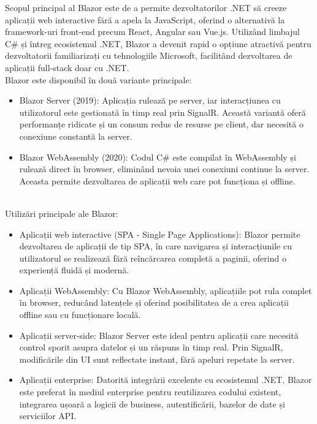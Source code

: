 Scopul principal al Blazor este de a permite dezvoltatorilor .NET să creeze aplicații web interactive fără a apela la JavaScript, oferind o alternativă la framework-uri front-end precum React, Angular sau Vue.js. Utilizând limbajul C\# și întreg ecosistemul .NET, Blazor a devenit rapid o opțiune atractivă pentru dezvoltatorii familiarizați cu tehnologiile Microsoft, facilitând dezvoltarea de aplicații full-stack doar cu .NET. \parencite{blazor}
\\Blazor este disponibil în două variante principale:
\begin{itemize}
    \item Blazor Server (2019): Aplicația rulează pe server, iar interacțiunea cu utilizatorul este gestionată în timp real prin SignalR. Această variantă oferă performanțe ridicate și un consum redus de resurse pe client, dar necesită o conexiune constantă la server.
    \item Blazor WebAssembly (2020): Codul C\# este compilat în WebAssembly și rulează direct în browser, eliminând nevoia unei conexiuni continue la server. Aceasta permite dezvoltarea de aplicații web care pot funcționa și offline.
\end{itemize}\parencite{blazor}
\\Utilizări principale ale Blazor:
\begin{itemize}
    \item Aplicații web interactive (SPA - Single Page Applications): Blazor permite dezvoltarea de aplicații de tip SPA, în care navigarea și interacțiunile cu utilizatorul se realizează fără reîncărcarea completă a paginii, oferind o experiență fluidă și modernă.
    \item Aplicații WebAssembly: Cu Blazor WebAssembly, aplicațiile pot rula complet în browser, reducând latențele și oferind posibilitatea de a crea aplicații offline sau cu funcționare locală.
    \item Aplicații server-side: Blazor Server este ideal pentru aplicații care necesită control sporit asupra datelor și un răspuns în timp real. Prin SignalR, modificările din UI sunt reflectate instant, fără apeluri repetate la server.
    \item Aplicații enterprise: Datorită integrării excelente cu ecosistemul .NET, Blazor este preferat în mediul enterprise pentru reutilizarea codului existent, integrarea ușoară a logicii de business, autentificării, bazelor de date și serviciilor API.
\end{itemize}\parencite{blazor}

